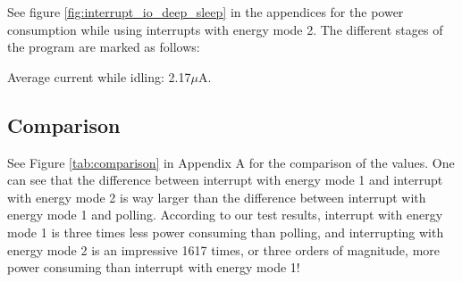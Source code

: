 See figure \ref{fig:interrupt_io_deep_sleep} in the appendices for the power consumption while using interrupts with energy mode 2. The different stages of the program are marked as follows:

Average current while idling: 2.17$\mu$A.

\subsection{Comparison}

See Figure \ref{tab:comparison} in Appendix A for the comparison of the values. One can see that the difference between interrupt with energy mode 1 and interrupt with energy mode 2 is way larger than the difference between interrupt with energy mode 1 and polling. According to our test results, interrupt with energy mode 1 is three times less power consuming than polling, and interrupting with energy mode 2 is an impressive 1617 times, or three orders of magnitude, more power consuming than interrupt with energy mode 1!

